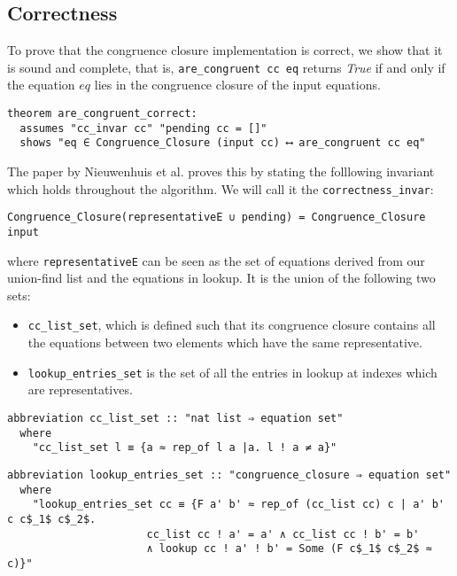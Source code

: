 \subsection{Correctness}
\label{subsection:uf-correctness}

To prove that the congruence closure implementation is correct, we show that it is sound and complete,
that is, \lstinline{are_congruent cc eq} returns \emph{True} if and only if the equation $eq$ lies in the congruence closure of the input equations.

\begin{lstlisting}
theorem are_congruent_correct:
  assumes "cc_invar cc" "pending cc = []"
  shows "eq ∈ Congruence_Closure (input cc) ⟷ are_congruent cc eq"
\end{lstlisting}

The paper by Nieuwenhuis et al. \cite{Nieuwenhuis} proves this by stating the folllowing invariant which holds throughout the algorithm. We will call it the \lstinline|correctness_invar|:

\begin{lstlisting}
Congruence_Closure(representativeE ∪ pending) = Congruence_Closure input
\end{lstlisting}

where \lstinline{representativeE} can be seen as the set of equations derived from our union-find list and the equations in lookup. It is the union of the following two sets:

\begin{itemize}
    \item\lstinline{cc_list_set}, which is defined such that its congruence closure contains all the equations between two elements which have the same representative.
    \item\lstinline{lookup_entries_set} is the set of all the entries in lookup at indexes which are representatives.
\end{itemize}

\begin{lstlisting}
abbreviation cc_list_set :: "nat list ⇒ equation set"
  where
    "cc_list_set l ≡ {a ≈ rep_of l a |a. l ! a ≠ a}"
\end{lstlisting}

\begin{lstlisting}
abbreviation lookup_entries_set :: "congruence_closure ⇒ equation set"
  where
    "lookup_entries_set cc ≡ {F a' b' ≈ rep_of (cc_list cc) c | a' b' c c$_1$ c$_2$.
                      cc_list cc ! a' = a' ∧ cc_list cc ! b' = b'
                      ∧ lookup cc ! a' ! b' = Some (F c$_1$ c$_2$ ≈ c)}"
\end{lstlisting}

